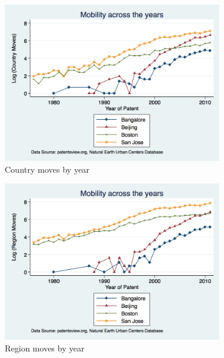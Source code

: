 \documentclass[12pt]{article}
\begin{document}
\begin{figure}[h!]
\begin{centering}
  \includegraphics[width=0.85\textwidth]{countrymoves}
  \caption{Country moves by year}
   \label{fig:countrymoves}
\end{centering}
\end{figure}

\begin{figure}[h!]
\begin{centering}
  \includegraphics[width=0.85\textwidth]{regionmoves}
  \caption{Region moves by year}
   \label{fig:regionmoves}
\end{centering}
\end{figure}
\end{document}
